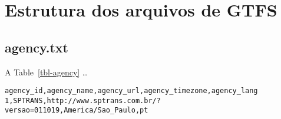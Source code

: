 \documentclass[
  letterpaper,
  DIV=11,
  numbers=noendperiod]{scrreprt}
\begin{document}
\hypertarget{estrutura-dos-arquivos-de-gtfs}{%
\section{Estrutura dos arquivos de
GTFS}\label{estrutura-dos-arquivos-de-gtfs}}

\hypertarget{agency.txt}{%
\subsection{agency.txt}\label{agency.txt}}

A Table~\ref{tbl-agency} \ldots{}

\begin{verbatim}
agency_id,agency_name,agency_url,agency_timezone,agency_lang
1,SPTRANS,http://www.sptrans.com.br/?versao=011019,America/Sao_Paulo,pt 
\end{verbatim}
\end{document}
